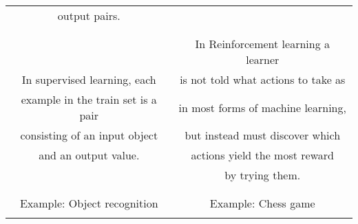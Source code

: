 \begin{tabular}{| c | c |}
 output pairs.                       &  \\
                                     &      \\
 \hline
                                     &    \\
                                     & In Reinforcement learning a learner \\
 In supervised learning, each        & is not told what actions to take as\\
 example in the train set is a pair  & in most forms of machine learning,\\
 consisting of an input object       & but instead must discover which\\
 and an output value.                & actions yield the most reward\\
                                     & by trying them.\\
                                     &    \\
 \hline
                                     &    \\
Example: Object recognition          & Example: Chess game \\
                                     &    \\
 \hline
\end{tabular}

